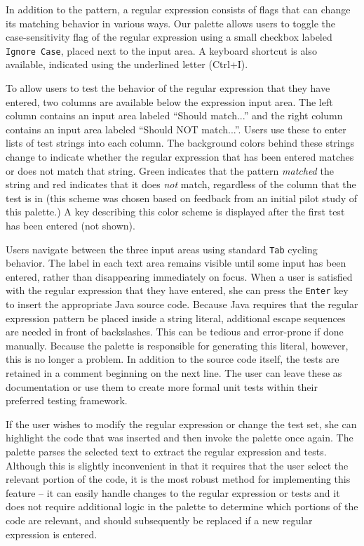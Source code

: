 \documentclass[10pt, conference, compsocconf]{IEEEtran}
\begin{document}
In addition to the pattern, a regular expression consists of flags that can change its matching behavior in various ways. Our palette allows users to toggle the case-sensitivity flag of the regular expression using a small checkbox labeled \verb|Ignore Case|, placed next to the input area. A keyboard shortcut is also available, indicated using the underlined letter (Ctrl+I). 

To allow users to test the behavior of the regular expression that they have entered, two columns are available below the expression input area. The left column contains an input area labeled ``Should match...'' and the right column contains an input area labeled ``Should NOT match...''. Users use these to enter lists of test  strings into each column. The background colors behind these strings change to indicate whether the regular expression that has been entered matches or does not match that string. Green indicates that the pattern  {\it matched} the string and red indicates that it does {\it not} match, regardless of the column that the test is in (this scheme was chosen based on feedback from an initial pilot study of this palette.) A key describing this color scheme is displayed after the first test has been entered (not shown).

Users navigate between the three input areas using standard \verb|Tab| cycling behavior. The label in each text area remains visible until some input has been entered, rather than disappearing immediately on focus. When a user is satisfied with the regular expression that they have entered, she can press the \verb|Enter| key to insert the appropriate Java source code. Because Java requires that the regular expression pattern be placed inside a string literal, additional escape sequences are needed in front of backslashes. This can be tedious and error-prone if done manually. Because the palette is responsible for generating this literal, however, this is no longer a problem. In addition to the source code itself, the tests are retained in a comment beginning on the next line. The user can leave these as documentation or use them to create more formal unit tests within their preferred testing framework.

If the user wishes to modify the regular expression or change the test set, she can highlight the code that was inserted and then invoke the palette once again. The palette parses the selected text to extract the regular expression and tests. Although this is slightly inconvenient in that it requires that the user select the relevant portion of the code, it is the most robust method for implementing this feature -- it can easily handle changes to the regular expression or tests and it does not require additional logic in the palette to determine which portions of the code are relevant, and should subsequently be replaced if a new regular expression is entered.
\end{document}
